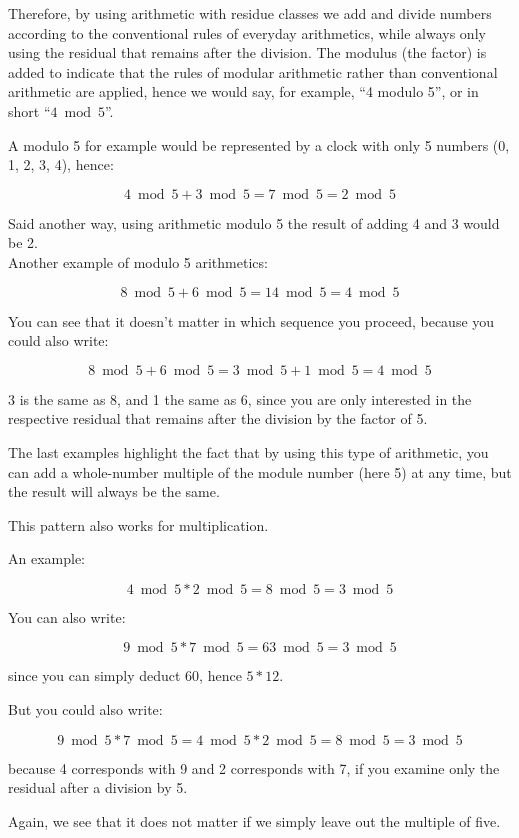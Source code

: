 \documentclass[a4paper,11pt,oneside,openright,titlepage]{scrbook}
\begin{document}
\clearpage
Therefore, by using arithmetic with residue classes we add and divide
numbers according to the conventional rules of everyday arithmetics,
while always only using the residual that remains after the division.
The modulus (the factor) is added to indicate that the rules of
modular arithmetic rather than conventional arithmetic are applied,
hence we would say, for example,  ``4 modulo 5'', or in short ``$4
\bmod 5$''.

A modulo 5 for example would be represented by a clock with only 5
numbers (0, 1, 2, 3, 4), hence:

\[ 4 \bmod 5 + 3 \bmod 5 = 7 \bmod 5 = 2 \bmod 5 \]

Said another way, using arithmetic modulo 5 the result of adding 4 and
3 would be 2. \\

Another example of modulo 5 arithmetics:

\[ 8 \bmod 5 + 6 \bmod 5 = 14 \bmod 5 = 4 \bmod 5 \]

You can see that it doesn't matter in which sequence you proceed,
because you could also write:

\[ 8 \bmod 5 + 6 \bmod 5 = 3 \bmod 5 + 1 \bmod 5 = 4 \bmod 5 \]

3 is the same as 8, and 1 the same as 6, since you are only interested
in the respective residual that remains after the division by the
factor of 5.

The last examples highlight the fact that by using this type of
arithmetic, you can add a whole-number multiple of the module number
(here 5) at any time, but the result will always be the same.


\clearpage
This pattern also works for multiplication.

An example:

\[ 4 \bmod 5 * 2 \bmod 5 = 8 \bmod 5 = 3 \bmod 5  \]

You can also write:

\[ 9 \bmod 5 * 7 \bmod 5 = 63 \bmod 5 = 3 \bmod 5 \]

since you can simply deduct 60, hence $5 * 12$.

But you could also write:

\[ 9 \bmod 5 * 7 \bmod 5 = 4 \bmod 5 * 2 \bmod 5 = 8 \bmod 5 = 3 \bmod 5 \]

because 4 corresponds with 9 and 2 corresponds with 7, if you examine
only the residual after a division by 5.

Again, we see that it does not matter if we simply leave out the
multiple of five.
\end{document}
